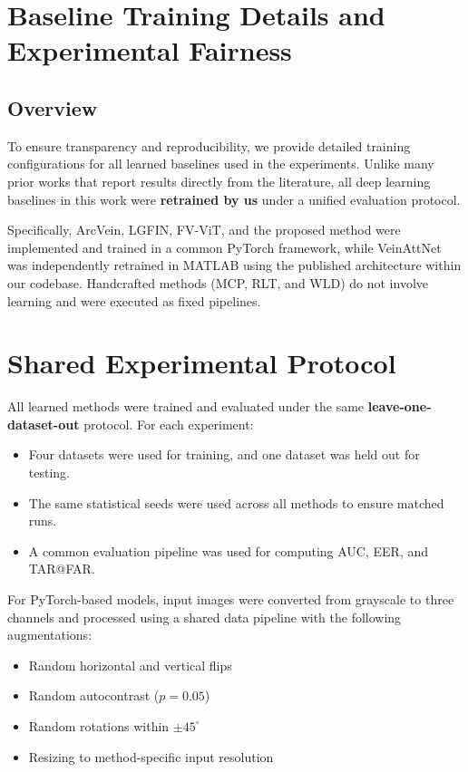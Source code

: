 \documentclass[10pt,journal,compsoc]{IEEEtran}
\begin{document}
\section{Baseline Training Details and Experimental Fairness}
\label{sec:supp_baseline_training}

\subsection{Overview}

To ensure transparency and reproducibility, we provide detailed training configurations for all learned baselines used in the experiments. Unlike many prior works that report results directly from the literature, all deep learning baselines in this work were \textbf{retrained by us} under a unified evaluation protocol.

Specifically, ArcVein, LGFIN, FV-ViT, and the proposed method were implemented and trained in a common PyTorch framework, while VeinAttNet was independently retrained in MATLAB using the published architecture within our codebase. Handcrafted methods (MCP, RLT, and WLD) do not involve learning and were executed as fixed pipelines.

\section{Shared Experimental Protocol}

All learned methods were trained and evaluated under the same \textbf{leave-one-dataset-out} protocol. For each experiment:
\begin{itemize}
    \item Four datasets were used for training, and one dataset was held out for testing.
    \item The same statistical seeds were used across all methods to ensure matched runs.
    \item A common evaluation pipeline was used for computing AUC, EER, and TAR@FAR.
\end{itemize}

For PyTorch-based models, input images were converted from grayscale to three channels and processed using a shared data pipeline with the following augmentations:
\begin{itemize}
    \item Random horizontal and vertical flips
    \item Random autocontrast ($p = 0.05$)
    \item Random rotations within $\pm 45^\circ$
    \item Resizing to method-specific input resolution
\end{itemize}
\end{document}
